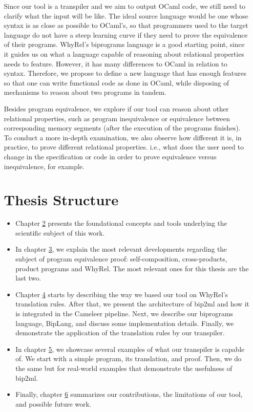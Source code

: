 Since our tool is a transpiler and we aim to output OCaml code, we still need to clarify what the input will be like.
The ideal source language would be one whose syntax is as close as possible to OCaml's, so that programmers used to the target language do not have a steep learning curve if they need to prove the equivalence of their programs. 
WhyRel's biprograms language is a good starting point, since it guides us on what a language capable of reasoning about relational properties needs to feature.
However, it has many differences to OCaml in relation to syntax.
Therefore, we propose to define a new language that has enough features so that one can write functional code as done in OCaml, while disposing of mechanisms to reason about two programs in tandem.

Besides program equivalence, we explore if our tool can reason about other relational properties, such as program inequivalence or equivalence between corresponding memory segments (after the execution of the programs finishes).
To conduct a more in-depth examination, we also observe how different it is, in practice, to prove different relational properties.
i.e., what does the user need to change in the specification or code in order to prove equivalence versus inequivalence, for example.


\section{Thesis Structure}

\begin{itemize}
    \setlength\itemsep{0.1em}
    \item Chapter \hyperref[cha:background]{2} presents the foundational concepts and tools underlying the scientific subject of this work.

    \item In chapter \hyperref[cha:state_of_the_art]{3}, we explain the most relevant developments regarding the subject of program equivalence proof: self-composition, cross-products, product programs and WhyRel.
    The most relevant ones for this thesis are the last two.

    \item Chapter \hyperref[cha:methodology]{4} starts by describing the way we based our tool on WhyRel's translation rules.
    After that, we present the architecture of bip2ml and how it is integrated in the Cameleer pipeline.
    Next, we describe our biprograms language, BipLang, and discuss some implementation details.
    Finally, we demonstrate the application of the translation rules by our transpiler.

    \item In chapter \hyperref[cha:case_studies]{5}, we showcase several examples of what our transpiler is capable of. 
    We start with a simple program, its translation, and proof.
    Then, we do the same but for real-world examples that demonstrate the usefulness of bip2ml.
    
    \item Finally, chapter \hyperref[cha:conclusion]{6} summarizes our contributions, the limitations of our tool, and possible future work.
\end{itemize}

